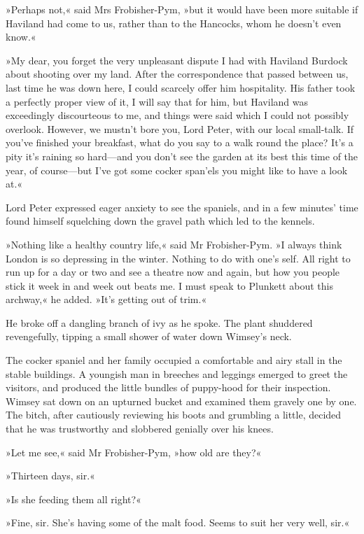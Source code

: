 »Perhaps not,« said Mrs Frobisher-Pym, »but it would have been more suitable if Haviland had come to us, rather than to the Hancocks, whom he doesn't even know.«

»My dear, you forget the very unpleasant dispute I had with Haviland Burdock about shooting over my land. After the correspondence that passed between us, last time he was down here, I could scarcely offer him hospitality. His father took a perfectly proper view of it, I will say that for him, but Haviland was exceedingly discourteous to me, and things were said which I could not possibly overlook. However, we mustn't bore you, Lord Peter, with our local small-talk. If you've finished your breakfast, what do you say to a walk round the place? It's a pity it's raining so hard—and you don't see the garden at its best this time of the year, of course—but I've got some cocker span'els you might like to have a look at.«

Lord Peter expressed eager anxiety to see the spaniels, and in a few minutes' time found himself squelching down the gravel path which led to the kennels.

»Nothing like a healthy country life,« said Mr Frobisher-Pym. »I always think London is so depressing in the winter. Nothing to do with one's self. All right to run up for a day or two and see a theatre now and again, but how you people stick it week in and week out beats me. I must speak to Plunkett about this archway,« he added. »It's getting out of trim.«

He broke off a dangling branch of ivy as he spoke. The plant shuddered revengefully, tipping a small shower of water down Wimsey's neck.

The cocker spaniel and her family occupied a comfortable and airy stall in the stable buildings. A youngish man in breeches and leggings emerged to greet the visitors, and produced the little bundles of puppy-hood for their inspection. Wimsey sat down on an upturned bucket and examined them gravely one by one. The bitch, after cautiously reviewing his boots and grumbling a little, decided that he was trustworthy and slobbered genially over his knees.

»Let me see,« said Mr Frobisher-Pym, »how old are they?«

»Thirteen days, sir.«

»Is she feeding them all right?«

»Fine, sir. She's having some of the malt food. Seems to suit her very well, sir.«

